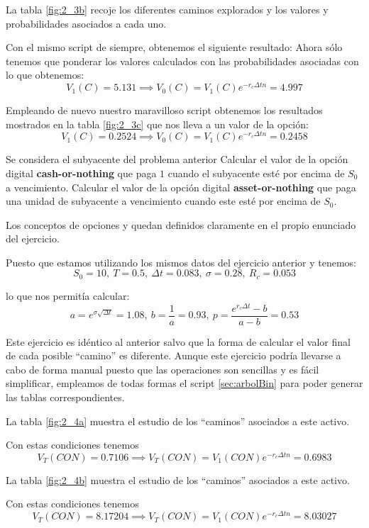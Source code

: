 \begin{problem}[3]
La tabla \ref{fig:2_3b} recoje los diferentes caminos explorados y los valores y probabilidades asociados a cada uno.

Con el mismo script de siempre, obtenemos el siguiente resultado:
Ahora sólo tenemos que ponderar los valores calculados con las probabilidades asociadas con lo que obtenemos:
\[V_1(C) = 5.131 \implies V_0(C) = V_1(C)e^{-r_cΔtn} = 4.997\]

\spart

Empleando de nuevo nuestro maravilloso script obtenemos los resultados mostrados en la tabla \ref{fig:2_3c} que nos lleva a un valor de la opción:
\[V_1(C) = 0.2524 \implies V_0(C) = V_1(C)e^{-r_cΔtn} = 0.2458\]
\end{problem}


\begin{problem}[4]
Se considera el subyacente del problema anterior
\ppart Calcular el valor de la opción digital \textbf{cash-or-nothing} que paga $1$ cuando el subyacente esté por encima de $S_0$ a vencimiento.
\ppart Calcular el valor de la opción digital \textbf{asset-or-nothing} que paga una unidad de subyacente a vencimiento cuando este esté por encima de $S_0$.
\solution


Los conceptos de opciones  y  quedan definidos claramente en el propio enunciado del ejercicio.

Puesto que estamos utilizando los mismos datos del ejercicio anterior y tenemos:
\[S_0=10, \ T=0.5, \ Δt = 0.083, \ σ=0.28, \ R_c=0.053\]

lo que nos permitía calcular:
\[a=e^{σ\sqrt{Δt}} = 1.08, \ b = \frac{1}{a} = 0.93, \ p = \frac{e^{r_cΔt}-b}{a-b}=0.53\]

Este ejercicio es idéntico al anterior salvo que la forma de calcular el valor final de cada posible ``camino'' es diferente. Aunque este ejercicio podría llevarse a cabo de forma manual puesto que las operaciones son sencillas y es fácil simplificar, empleamos de todas formas el script \ref{sec:arbolBin} para poder generar las tablas correspondientes.

\spart

La tabla \ref{fig:2_4a} muestra el estudio de los ``caminos'' asociados a este activo.


Con estas condiciones tenemos
\[V_T(CON) = 0.7106 \implies V_T(CON) = V_1(CON)e^{-r_cΔtn} = 0.6983\]

\spart

La tabla \ref{fig:2_4b} muestra el estudio de los ``caminos'' asociados a este activo.

Con estas condiciones tenemos
\[V_T(CON) = 8.17204 \implies V_T(CON) = V_1(CON)e^{-r_cΔtn} = 8.03027\]

\end{problem}

